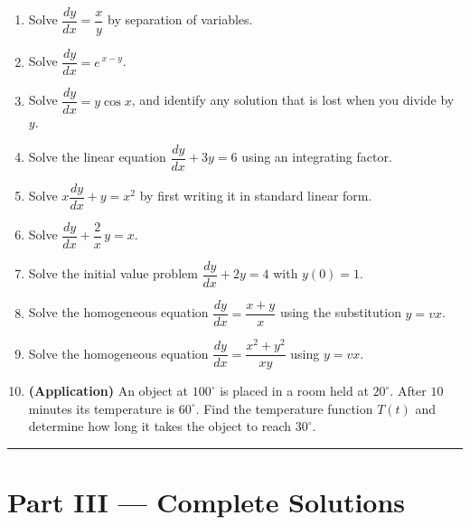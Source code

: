 \begin{enumerate}[leftmargin=2em]
    \item Solve $\dfrac{dy}{dx} = \dfrac{x}{y}$ by separation of variables.

    \item Solve $\dfrac{dy}{dx} = e^{\,x - y}$.

    \item Solve $\dfrac{dy}{dx} = y\cos x$, and identify any solution that is
          lost when you divide by $y$.

    \item Solve the linear equation $\dfrac{dy}{dx} + 3y = 6$ using an
          integrating factor.

    \item Solve $x\dfrac{dy}{dx} + y = x^{2}$ by first writing it in standard
          linear form.

    \item Solve $\dfrac{dy}{dx} + \dfrac{2}{x}\,y = x$.

    \item Solve the initial value problem $\dfrac{dy}{dx} + 2y = 4$ with
          $y(0) = 1$.

    \item Solve the homogeneous equation $\dfrac{dy}{dx} = \dfrac{x + y}{x}$
          using the substitution $y = vx$.

    \item Solve the homogeneous equation
          $\dfrac{dy}{dx} = \dfrac{x^{2} + y^{2}}{xy}$ using $y = vx$.

    \item \textbf{(Application)} An object at $100^{\circ}$ is placed in a room
          held at $20^{\circ}$. After $10$ minutes its temperature is
          $60^{\circ}$. Find the temperature function $T(t)$ and determine how
          long it takes the object to reach $30^{\circ}$.
\end{enumerate}

\vspace{0.4em}
\hrule
\vspace{0.6em}

\clearpage
{}
{}
\section*{Part III --- Complete Solutions}

